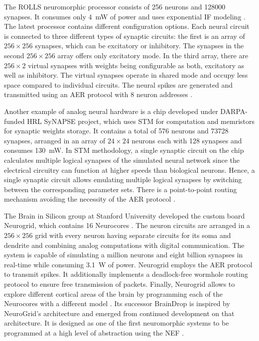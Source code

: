 The \ac{ROLLS} neuromorphic processor consists of \num{256} neurons and \num{128000} synapses.
It consumes only \SI{4}{\milli\watt} of power and uses exponential \ac{IF} modeling \parencite{Qiao2015}.
The latest processor contains different configuration options.
Each neural circuit is connected to three different types of synaptic circuits: the first is an array of $256\times256$ synapses, which can be excitatory or inhibitory.
The synapses in the second $256\times256$ array offers only excitatory mode.
In the third array, there are $256\times2$ virtual synapses with weights being configurable as both, excitatory as well as inhibitory.
The virtual synapses operate in shared mode and occupy less space compared to individual circuits.
The neural spikes are generated and transmitted using an \ac{AER} protocol with \SI{8}{\bit} neuron addresses \parencite{Qiao2015}.

Another example of analog neural hardware is a chip \parencite{Srinivasa2012} developed under \ac{DARPA}-funded \ac{HRL} \ac{SyNAPSE} project, which uses \ac{STM} for computation and memristors for synaptic weights storage.
It contains a total of \num{576} neurons and \num{73728} synapses, arranged in an array of $24\times24$ neurons each with \num{128} synapses and consumes \SI{130}{\milli\watt}.
In \ac{STM} methodology, a single synaptic circuit on the chip calculates multiple logical synapses of the simulated neural network since the electrical circuitry can function at higher speeds than biological neurons.
Hence, a single synaptic circuit allows emulating multiple logical synapses by switching between the corresponding parameter sets.
There is a point-to-point routing mechanism avoiding the necessity of the \ac{AER} protocol \parencite{Walter2015}. 

The Brain in Silicon group at Stanford University developed the custom board Neurogrid, which contains \num{16} Neurocores \parencite{Benjamin2014, Choudhary2012}.
The neuron circuits are arranged in a $256\times256$ grid with every neuron having separate circuits for its soma and  dendrite and combining analog computations with digital communication.
The system is capable of simulating a million neurons and eight billion synapses in real-time while consuming \SI{3.1}{\watt} of power.
Neurogrid employs the \ac{AER} protocol to transmit spikes.
It additionally implements a deadlock-free wormhole routing protocol to ensure free transmission of packets.
Finally, Neurogrid allows to explore different cortical areas of the brain by programming each of the Neurocores with a different model \parencite{Merolla2014}.
Its successor BrainDrop \parencite{Neckar2019} is inspired by NeuroGrid's architecture and emerged from continued development on that architecture.
It is designed as one of the first neuromorphic systems to be programmed at a high level of abstraction using the \ac{NEF} \parencite{Eliasmith2003}.

